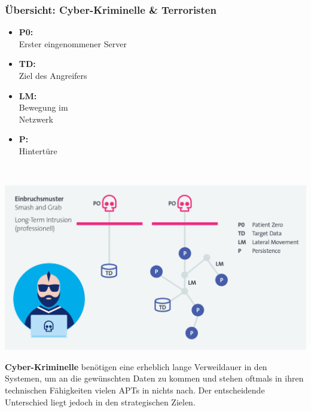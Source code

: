 \subsubsection{Übersicht: Cyber-Kriminelle \& Terroristen}
\begin{minipage}{0.3\linewidth}
    \begin{itemize}
        \item \textbf{P0:}\\ Erster eingenommener Server
        \item \textbf{TD:}\\ Ziel des Angreifers
        \item \textbf{LM:}\\ Bewegung im\\ Netzwerk
        \item \textbf{P:}\\ Hintertüre
    \end{itemize}
    \vfill
    $ $
\end{minipage}
\begin{minipage}{0.7\linewidth}
    \begin{center}
        \includegraphics[width=\linewidth]{./img/01_cyber-defense/cyber_terrorists}
    \end{center}
\end{minipage}

\textbf{Cyber-Kriminelle} benötigen eine erheblich lange Verweildauer in den Systemen, um an die gewünschten Daten zu kommen und stehen oftmals in ihren technischen Fähigkeiten vielen APTs in nichts nach. Der entscheidende
Unterschied liegt jedoch in den strategischen Zielen.



